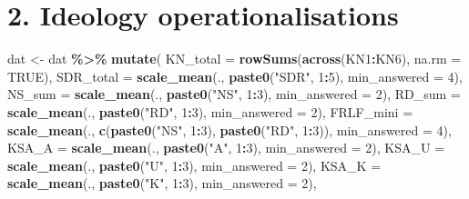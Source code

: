 \documentclass[
  10pt,
]{article}
\newenvironment{Shaded}{\begin{snugshade}}{\end{snugshade}}
\newcommand{\AttributeTok}[1]{\textcolor[rgb]{0.13,0.29,0.53}{#1}}
\newcommand{\ConstantTok}[1]{\textcolor[rgb]{0.56,0.35,0.01}{#1}}
\newcommand{\DecValTok}[1]{\textcolor[rgb]{0.00,0.00,0.81}{#1}}
\newcommand{\FunctionTok}[1]{\textcolor[rgb]{0.13,0.29,0.53}{\textbf{#1}}}
\newcommand{\NormalTok}[1]{#1}
\newcommand{\OtherTok}[1]{\textcolor[rgb]{0.56,0.35,0.01}{#1}}
\newcommand{\SpecialCharTok}[1]{\textcolor[rgb]{0.81,0.36,0.00}{\textbf{#1}}}
\newcommand{\StringTok}[1]{\textcolor[rgb]{0.31,0.60,0.02}{#1}}
\begin{document}
\hypertarget{ideology-operationalisations}{%
\section{2. Ideology
operationalisations}\label{ideology-operationalisations}}

\begin{Shaded}
\begin{Highlighting}[]
\NormalTok{dat }\OtherTok{\textless{}{-}}\NormalTok{ dat }\SpecialCharTok{\%\textgreater{}\%}
  \FunctionTok{mutate}\NormalTok{(}
    \AttributeTok{KN\_total   =} \FunctionTok{rowSums}\NormalTok{(}\FunctionTok{across}\NormalTok{(KN1}\SpecialCharTok{:}\NormalTok{KN6), }\AttributeTok{na.rm =} \ConstantTok{TRUE}\NormalTok{),}
    \AttributeTok{SDR\_total  =} \FunctionTok{scale\_mean}\NormalTok{(., }\FunctionTok{paste0}\NormalTok{(}\StringTok{"SDR"}\NormalTok{, }\DecValTok{1}\SpecialCharTok{:}\DecValTok{5}\NormalTok{), }\AttributeTok{min\_answered =} \DecValTok{4}\NormalTok{),}
    \AttributeTok{NS\_sum     =} \FunctionTok{scale\_mean}\NormalTok{(., }\FunctionTok{paste0}\NormalTok{(}\StringTok{"NS"}\NormalTok{, }\DecValTok{1}\SpecialCharTok{:}\DecValTok{3}\NormalTok{), }\AttributeTok{min\_answered =} \DecValTok{2}\NormalTok{),}
    \AttributeTok{RD\_sum     =} \FunctionTok{scale\_mean}\NormalTok{(., }\FunctionTok{paste0}\NormalTok{(}\StringTok{"RD"}\NormalTok{, }\DecValTok{1}\SpecialCharTok{:}\DecValTok{3}\NormalTok{), }\AttributeTok{min\_answered =} \DecValTok{2}\NormalTok{),}
    \AttributeTok{FRLF\_mini  =} \FunctionTok{scale\_mean}\NormalTok{(., }\FunctionTok{c}\NormalTok{(}\FunctionTok{paste0}\NormalTok{(}\StringTok{"NS"}\NormalTok{, }\DecValTok{1}\SpecialCharTok{:}\DecValTok{3}\NormalTok{),}
                                 \FunctionTok{paste0}\NormalTok{(}\StringTok{"RD"}\NormalTok{, }\DecValTok{1}\SpecialCharTok{:}\DecValTok{3}\NormalTok{)), }\AttributeTok{min\_answered =} \DecValTok{4}\NormalTok{),}
    \AttributeTok{KSA\_A      =} \FunctionTok{scale\_mean}\NormalTok{(., }\FunctionTok{paste0}\NormalTok{(}\StringTok{"A"}\NormalTok{, }\DecValTok{1}\SpecialCharTok{:}\DecValTok{3}\NormalTok{), }\AttributeTok{min\_answered =} \DecValTok{2}\NormalTok{),}
    \AttributeTok{KSA\_U      =} \FunctionTok{scale\_mean}\NormalTok{(., }\FunctionTok{paste0}\NormalTok{(}\StringTok{"U"}\NormalTok{, }\DecValTok{1}\SpecialCharTok{:}\DecValTok{3}\NormalTok{), }\AttributeTok{min\_answered =} \DecValTok{2}\NormalTok{),}
    \AttributeTok{KSA\_K      =} \FunctionTok{scale\_mean}\NormalTok{(., }\FunctionTok{paste0}\NormalTok{(}\StringTok{"K"}\NormalTok{, }\DecValTok{1}\SpecialCharTok{:}\DecValTok{3}\NormalTok{), }\AttributeTok{min\_answered =} \DecValTok{2}\NormalTok{),}

\end{Highlighting}
\end{Shaded}
\end{document}
